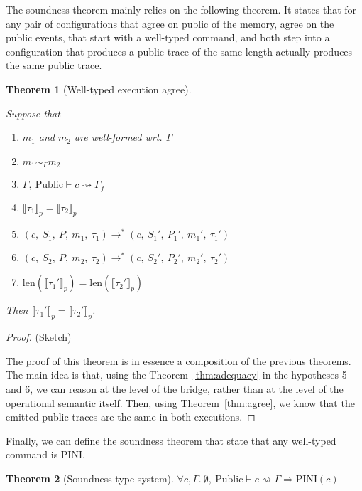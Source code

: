 \documentclass[10pt]{article}
\newcommand{\ctx}{\Gamma}
\newcommand{\typing}[4]{ #1,~#2 \vdash #3 \rightsquigarrow #4}
\newcommand{\exectrans}[2] { #1 \rightarrow^{*} #2 }
\newcommand{\pproj}[1]{\llbracket #1 \rrbracket_{p}}
\newcommand{\agree}[3]{#2 \sim_{#1} #3}
\newcommand{\pini}[1]{\mathrm{PINI}(#1)}
\newtheorem{theorem}{Theorem}
\begin{document}
The soundness theorem mainly relies on the following theorem. It states that for
any pair of configurations that agree on public of the memory, agree on the public events,
that start with a well-typed command, and both step into a configuration that produces a
public trace of the same length actually produces the same public trace.

\begin{theorem}[Well-typed execution agree]\label{thm:sound}

Suppose that

\begin{enumerate}
  \item $m_{1}$ and $m_{2}$ are well-formed wrt. $\ctx$
  \item $\agree{\ctx}{m_{1}}{m_{2}}$
  \item \( \typing{\ctx}{\mathrm{Public}}{c}{\ctx_{f}}\)
  \item $\pproj{\tau_{1}} = \pproj{\tau_{2}}$
  \item \(
        \exectrans
        {(c,~S_{1},~P,~m_{1},~\tau_{1})}
        {(c,~S_{1}',~P_{1}',~m_{1}',~\tau_{1}')}
        \)
  \item \(
        \exectrans
        {(c,~S_{2},~P,~m_{2},~\tau_{2})}
        {(c,~S_{2}',~P_{2}',~m_{2}',~\tau_{2}')}
        \)
  \item $\mathrm{len}(\pproj{\tau_{1}'}) = \mathrm{len}(\pproj{\tau_{2}'})$
\end{enumerate}

Then $\pproj{\tau_{1}'} = \pproj{\tau_{2}'}$.
\end{theorem}


\begin{proof} (Sketch)

  The proof of this theorem is in essence a composition of the previous theorems. The main idea is
  that, using the Theorem~\ref{thm:adequacy} in the hypotheses 5 and 6,
  we can reason at the level of the bridge, rather than at the level of the operational semantic
  itself.
  Then, using Theorem~\ref{thm:agree}, we know that the emitted public traces are the same in both
  executions.

\end{proof}

Finally, we can define the soundness theorem that state that any well-typed command is PINI.

\begin{theorem}[Soundness type-system]
  \( \forall c, \ctx.\
  \typing{\emptyset}{\mathrm{Public}}{c}{\ctx}
  \Rightarrow \pini{c}
  \)
\end{theorem}
\end{document}
